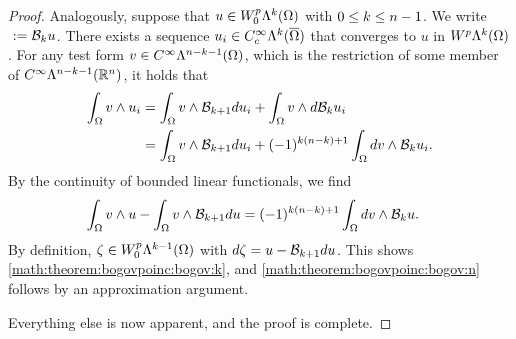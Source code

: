 \documentclass[10pt,a4paper]{article}
\begin{document}
\begin{proof}
    Analogously, suppose that $u \in W^{p}_{0}\Lambda^{k}(\Omega)$ with $0 \leq k \leq n-1$. 
    We write $\ := {\mathcal B}_{k} u$. 
    There exists a sequence $u_{i} \in C^{\infty}_{c}\Lambda^{k}(\overline\Omega)$ that converges to $u$ in $W^{p}\Lambda^{k}(\Omega)$. 
    For any test form $v \in C^{\infty}\Lambda^{n-k-1}(\Omega)$, 
    which is the restriction of some member of $C^{\infty}\Lambda^{n-k-1}({\mathbb R}^{n})$, 
    it holds that 
    \begin{align*}
        \int_{\Omega} v \wedge u_{i} 
        &=
        \int_{\Omega} v \wedge {\mathcal B}_{k+1} d u_{i}
        +
        \int_{\Omega} v \wedge d {\mathcal B}_{k  } u_{i}
        \\&=
        \int_{\Omega} v \wedge {\mathcal B}_{k+1} d u_{i}
        +
        (-1)^{k(n-k)+1}
        \int_{\Omega} d v \wedge {\mathcal B}_{k  } u_{i}
        .
    \end{align*}
    By the continuity of bounded linear functionals, we find 
    \begin{align*}
        \int_{\Omega} v \wedge u 
        -
        \int_{\Omega} v \wedge {\mathcal B}_{k+1} d u
        &=
        (-1)^{k(n-k)+1}
        \int_{\Omega} d v \wedge {\mathcal B}_{k  } u 
        .
    \end{align*}
    By definition, $\zeta \in W^{p}_{0}\Lambda^{k-1}(\Omega)$ with $d \zeta = u - {\mathcal B}_{k+1} d u$.
    This shows \eqref{math:theorem:bogovpoinc:bogov:k}, and \eqref{math:theorem:bogovpoinc:bogov:n} follows by an approximation argument.
    
    Everything else is now apparent, and the proof is complete. 
\begin{comment}
    It suffices to discuss the case $1 \leq p < \infty$, because the domain is bounded 
    and taking the limit will then imply the inequality with $p = \infty$. 
    The potential operators are linear and satisfy the stated bounds over $C^{\infty}_{c}\Alt^{\mia}(\Omega)$,
    which is a dense subspace of $L^{p}\Alt^{\mia}(\Omega)$. 

    \color{blue}
    Let $u \in W^{p}_{ }\Alt^{\mia}(\Omega)$ with $0 \leq \mia \leq n-1$ and set $w = \Poinc_{\mia} \cartan u$.
    There exists a sequence $u_{i} \in C^{\infty}\Alt^{\mia}(\overline\Omega)$ that converges to $u$ in $W^{p}\Alt^{\mia}(\Omega)$. 
    For any test form $v \in C^{\infty}_{c}\Alt^{n-\mia-1}(\Omega)$, we verify 
    \begin{align*}
        \int_{\Omega} \cartan v \wedge \Poinc_{\mia+1} \cartan u_{i}
        =
        \int_{\Omega} v \wedge \cartan \Poinc_{\mia+1} \cartan u_{i}
        =
        \int_{\Omega} v \wedge \cartan u_{i}
        .
    \end{align*}
    By the continuity of bounded linear functionals, we find 
    \begin{align*}
        \int_{\Omega} v \wedge \cartan u 
        &=
        (-1)^{\mia(n-\mia)+1}
        \int_{\Omega} \cartan v \wedge w
        .
    \end{align*}
    By definition, $w \in W^{p}\Alt^{\mia-1}(\Omega)$ with $\cartan w = u$.
    \color{black}
    

\end{comment}
\end{proof}
\end{document}

